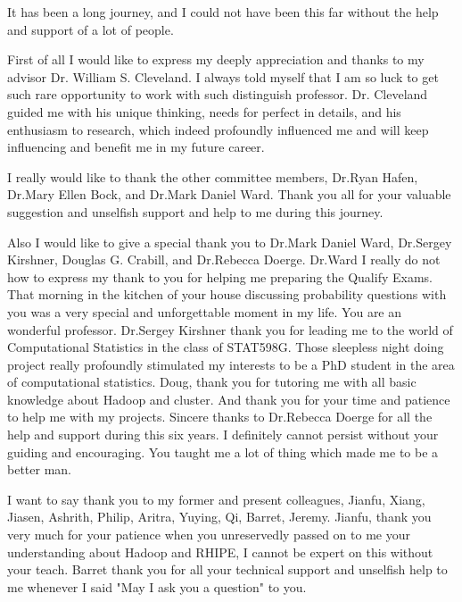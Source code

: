 \begin{acknowledgments}
  It has been a long journey, and I could not have been this far without the help and
  support of a lot of people.

  First of all I would like to express my deeply appreciation and thanks to my advisor
  Dr. William S. Cleveland. I always told myself that I am so luck to get such rare
  opportunity to work with such distinguish professor. Dr. Cleveland guided me with his
  unique thinking, needs for perfect in details, and his enthusiasm to research, which 
  indeed profoundly influenced me and will keep influencing and benefit me in my future 
  career.

  I really would like to thank the other committee members, Dr.Ryan Hafen,
  Dr.Mary Ellen Bock, and Dr.Mark Daniel Ward. Thank you all for your valuable 
  suggestion and unselfish support and help to me during this journey.

  Also I would like to give a special thank you to Dr.Mark Daniel Ward, Dr.Sergey
  Kirshner, Douglas G. Crabill, and Dr.Rebecca Doerge. 
  Dr.Ward I really do not how to express my thank to you for helping me preparing
  the Qualify Exams. That morning in the kitchen of your house discussing probability 
  questions with you was a very special and unforgettable moment in my life. You are an 
  wonderful professor.  
  Dr.Sergey Kirshner thank you for leading me to the world of Computational Statistics in 
  the class of STAT598G. Those sleepless night doing project really profoundly stimulated 
  my interests to be a PhD student in the area of computational statistics.
  Doug, thank you for tutoring me with all basic knowledge about Hadoop and cluster. And
  thank you for your time and patience to help me with my projects. 
  Sincere thanks to Dr.Rebecca Doerge for all the help and support during this six years. I
  definitely cannot persist without your guiding and encouraging. You taught me a lot of 
  thing which made me to be a better man.

  I want to say thank you to my former and present colleagues, Jianfu, Xiang, Jiasen,
  Ashrith, Philip, Aritra, Yuying, Qi, Barret, Jeremy. Jianfu, thank you very much for 
  your patience when you unreservedly passed on to me your understanding about Hadoop and
  RHIPE, I cannot be expert on this without your teach. Barret thank you for all your
  technical support and unselfish help to me whenever I said "May I ask you a question" to 
  you. 


\end{acknowledgments}
